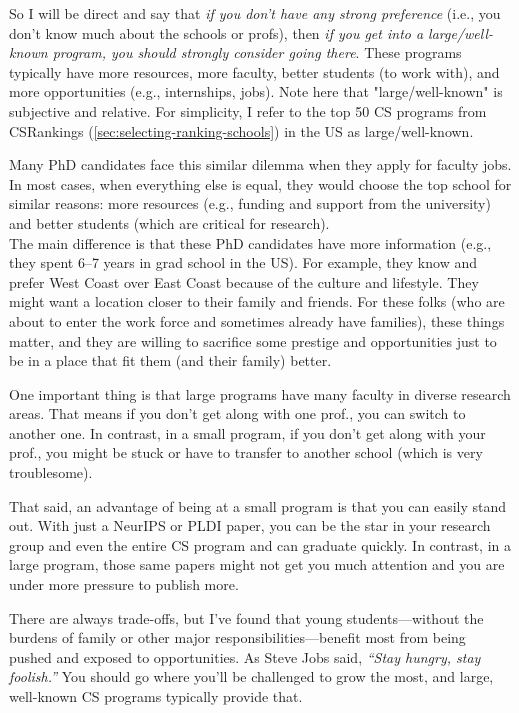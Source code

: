 \documentclass[oneside,11pt]{book}
\newenvironment{commentbox}[1][]{
  \small
  \begin{marker}[\faChessPawn{}]
    {\textbf{#1}}
  }{
  \end{marker}
}
\begin{document}
So I will be direct and say that \emph{if you don't have any strong preference} (i.e., you don't know much about the schools or profs), then \emph{if you get into a large/well-known program, you should strongly consider going there}.  These programs typically have more resources, more faculty, better students (to work with), and more opportunities (e.g., internships, jobs). Note here that "large/well-known" is subjective and relative. For simplicity, I refer to the top 50 CS programs from CSRankings (\autoref{sec:selecting-ranking-schools}) in the US as large/well-known.

\begin{commentbox}
  Many PhD candidates face this similar dilemma when they apply for faculty jobs. In most cases, when everything else is equal, they would choose the top school for similar reasons: more resources (e.g., funding and support from the university) and better students (which are critical for research).
  \\

  The main difference is that these PhD candidates have more information (e.g., they spent 6--7 years in grad school in the US). For example, they know and prefer West Coast over East Coast because of the culture and lifestyle. They might want a location closer to their family and friends. 
  For these folks (who are about to enter the work force and sometimes already have families), these things matter, and they are willing to sacrifice some prestige and opportunities just to be in a place that fit them (and their family) better. 
\end{commentbox}



One important thing is that  large programs have many faculty in diverse research areas. That means if you don't get along with one prof., you can switch to another one.  In contrast, in a small program, if you don't get along with your prof., you might be stuck or have to transfer to another school (which is very troublesome). 

That said, an advantage of being at a small program is that you can easily stand out. With just a NeurIPS or PLDI paper, you can be the star in your research group and even the entire CS program and can graduate quickly. In contrast, in a large program, those same papers might not get you much attention and you are under more pressure to publish more.  

\begin{commentbox}
  There are always trade-offs, but I've found that young students---without the burdens of family or other major responsibilities---benefit most from being pushed and exposed to opportunities. As Steve Jobs said, \emph{``Stay hungry, stay foolish.''} You should go where you'll be challenged to grow the most, and large, well-known CS programs typically provide that.
\end{commentbox}
\end{document}
